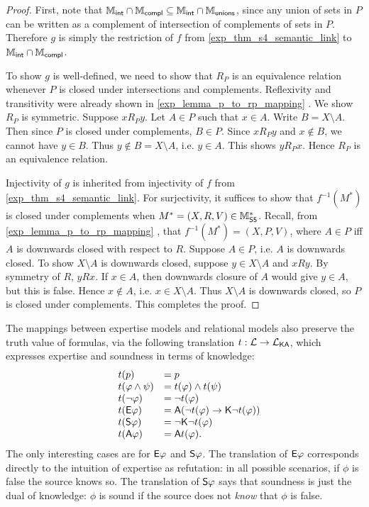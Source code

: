 \begin{proof}
    First, note that $\Mint \cap \Mcompl \subseteq \Mint \cap
    \Munions$, since any union of sets in $P$ can be written as a
    complement of intersection of complements of sets in $P$. Therefore
    $g$ is simply the restriction of $f$ from
    \cref{exp_thm_s4_semantic_link} to $\Mint \cap \Mcompl$.

    To show $g$ is well-defined, we need to show that $R_P$ is an equivalence
    relation whenever $P$ is closed under intersections and complements.
    Reflexivity and transitivity were already shown in
    \cref{exp_lemma_p_to_rp_mapping} . We show $R_P$ is
    symmetric.  Suppose $x{R_P}y$. Let $A \in P$ such that $x \in A$.  Write $B
    = X \setminus A$. Then since $P$ is closed under complements, $B \in P$.
    Since $x{R_P}y$ and $x \notin B$, we cannot have $y \in B$. Thus $y \notin
    B = X \setminus A$, i.e. $y \in A$. This shows $y{R_P}x$. Hence $R_P$ is an
    equivalence relation.

    Injectivity of $g$ is inherited from injectivity of $f$ from
    \cref{exp_thm_s4_semantic_link}. For surjectivity, it suffices to show that
    $f^{-1}(M^*)$ is closed under complements when $M^* = (X, R, V) \in
    \Msfive$. Recall, from \cref{exp_lemma_p_to_rp_mapping}
    , that $f^{-1}(M^*) = (X, P, V)$, where $A
    \in P$ iff $A$ is downwards closed with respect to $R$. Suppose $A \in P$,
    i.e. $A$ is downwards closed. To show $X \setminus A$ is downwards closed,
    suppose $y \in X \setminus A$ and $xRy$.  By symmetry of $R$, $yRx$. If $x
    \in A$, then downwards closure of $A$ would give $y \in A$, but this is
    false. Hence $x \notin A$, i.e. $x \in X \setminus A$. Thus $X \setminus A$
    is downwards closed, so $P$ is closed under complements. This completes the
    proof.
\end{proof}

The mappings between expertise models and relational models also preserve the
truth value of formulas, via the following translation $t: \cL \to
\cLKA$, which expresses expertise and soundness in terms of knowledge:
\[
\begin{array}{lll}
 &t(p) &= p \\
 &t(\phi \land \psi) &= t(\phi) \land t(\psi) \\
 &t(\neg\phi) &= \neg t(\phi) \\
 &t(\E\phi) &= \A(\neg t(\phi) \limplies \K\neg t(\phi)) \\
 &t(\S\phi) &= \neg\K\neg t(\phi) \\
 &t(\A\phi) &= \A t(\phi).
\end{array}
\]
The only interesting cases are for $\E\phi$ and $\S\phi$. The
translation of $\E\phi$ corresponds directly to the intuition of
expertise as refutation: in all possible scenarios, if $\phi$ is false
the source knows so. The translation of $\S\phi$ says that soundness is
just the dual of knowledge: $\phi$ is sound if the source does not \emph{know}
that $\phi$ is false.

